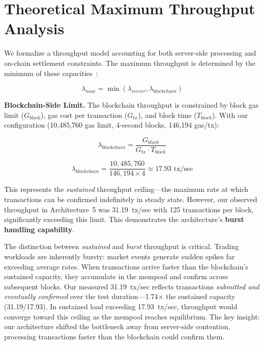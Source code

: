 \section{Theoretical Maximum Throughput Analysis}
\label{sec:theoretical}

We formalize a throughput model accounting for both server-side processing and on-chain settlement constraints. The maximum throughput is determined by the minimum of these capacities~\cite{harcholbalter2013performance}:

\begin{equation}
\lambda_{max} = \min(\lambda_{server}, \lambda_{blockchain})
\label{eq:lambda_max}
\end{equation}

\textbf{Blockchain-Side Limit.} The blockchain throughput is constrained by block gas limit ($G_{block}$), gas cost per transaction ($G_{tx}$), and block time ($T_{block}$). With our configuration (10,485,760 gas limit, 4-second blocks, 146,194 gas/tx):

\noindent
\begin{minipage}{0.48\textwidth}
\begin{equation}
\lambda_{blockchain} = \frac{G_{block}}{G_{tx} \cdot T_{block}}
\end{equation}
\end{minipage}%
\hfill
\begin{minipage}{0.48\textwidth}
\begin{equation}
\lambda_{blockchain} = \frac{10{,}485{,}760}{146{,}194 \times 4} \approx 17.93 \text{ tx/sec}
\end{equation}
\end{minipage}

This represents the \textit{sustained} throughput ceiling—the maximum rate at which transactions can be confirmed indefinitely in steady state. However, our observed throughput in Architecture~5 was 31.19~tx/sec with 125 transactions per block, significantly exceeding this limit. This demonstrates the architecture's \textbf{burst handling capability}.

The distinction between \textit{sustained} and \textit{burst} throughput is critical. Trading workloads are inherently bursty: market events generate sudden spikes far exceeding average rates. When transactions arrive faster than the blockchain's sustained capacity, they accumulate in the mempool and confirm across subsequent blocks. Our measured 31.19~tx/sec reflects transactions \textit{submitted and eventually confirmed} over the test duration—1.74$\times$ the sustained capacity (31.19/17.93). In sustained load exceeding 17.93~tx/sec, throughput would converge toward this ceiling as the mempool reaches equilibrium. The key insight: our architecture shifted the bottleneck away from server-side contention, processing transactions faster than the blockchain could confirm them.

